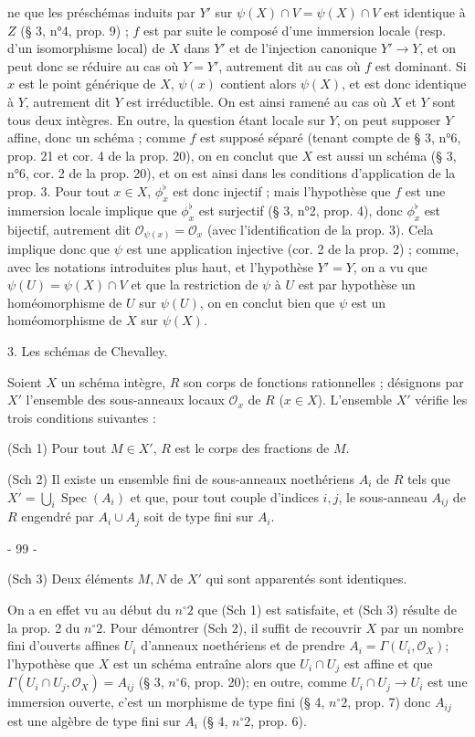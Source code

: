 ne que les préschémas induits par $Y'$ sur $\psi(X) \cap V = \psi(X) \cap V$ est identique à $Z$ (§ 3, n°4, prop. 9) ; $f$ est par suite le composé d'une immersion locale (resp. d'un isomorphisme local) de $X$ dans $Y'$ et de l'injection canonique $Y' \to Y$, et on peut donc se réduire au cas où $Y=Y'$, autrement dit au cas où $f$ est dominant. Si $x$ est le point générique de $X$, $\psi(x)$ contient alors $\psi(X)$, et est donc identique à $Y$, autrement dit $Y$ est irréductible. On est ainsi ramené au cas où $X$ et $Y$ sont tous deux intègres. En outre, la question étant locale sur $Y$, on peut supposer $Y$ affine, donc un schéma ; comme $f$ est supposé séparé (tenant compte de § 3, n°6, prop. 21 et cor. 4 de la prop. 20), on en conclut que $X$ est aussi un schéma (§ 3, n°6, cor. 2 de la prop. 20), et on est ainsi dans les conditions d'application de la prop. 3. Pour tout $x \in X$, $\phi_x^\flat$ est donc injectif ; mais l'hypothèse que $f$ est une immersion locale implique que $\phi_x^\flat$ est surjectif (§ 3, n°2, prop. 4), donc $\phi_x^\flat$ est bijectif, autrement dit $\mathcal{O}_{\psi(x)} = \mathcal{O}_x$ (avec l'identification de la prop. 3). Cela implique donc que $\psi$ est une application injective (cor. 2 de la prop. 2) ; comme, avec les notations introduites plus haut, et l'hypothèse $Y'=Y$, on a vu que $\psi(U) = \psi(X) \cap V$ et que la restriction de $\psi$ à $U$ est par hypothèse un homéomorphisme de $U$ sur $\psi(U)$, on en conclut bien que $\psi$ est un homéomorphisme de $X$ sur $\psi(X)$.

3. Les schémas de Chevalley.

Soient $X$ un schéma intègre, $R$ son corps de fonctions rationnelles ; désignons par $X'$ l'ensemble des sous-anneaux locaux $\mathcal{O}_x$ de $R$ ($x \in X$). L'ensemble $X'$ vérifie les trois conditions suivantes :

(Sch 1) Pour tout $M \in X'$, $R$ est le corps des fractions de $M$.

(Sch 2) Il existe un ensemble fini de sous-anneaux noethériens $A_i$ de $R$ tels que $X' = \bigcup_i \operatorname{Spec}(A_i)$ et que, pour tout couple d'indices $i, j$, le sous-anneau $A_{ij}$ de $R$ engendré par $A_i \cup A_j$ soit de type fini sur $A_i$.

\newpage


- 99 -

(Sch 3) Deux éléments $M, N$ de $X'$ qui sont apparentés sont identiques.

On a en effet vu au début du $n^\circ 2$ que (Sch 1) est satisfaite, et (Sch 3) résulte de la prop. 2 du $n^\circ 2$. Pour démontrer (Sch 2), il suffit de recouvrir $X$ par un nombre fini d'ouverts affines $U_i$ d'anneaux noethériens et de prendre $A_i = \Gamma(U_i, \mathcal{O}_X)$; l'hypothèse que $X$ est un schéma entraîne alors que $U_i \cap U_j$ est affine et que $\Gamma(U_i \cap U_j, \mathcal{O}_X) = A_{ij}$ (§ 3, $n^\circ 6$, prop. 20); en outre, comme $U_i \cap U_j \to U_i$ est une immersion ouverte, c'est un morphisme de type fini (§ 4, $n^\circ 2$, prop. 7) donc $A_{ij}$ est une algèbre de type fini sur $A_i$ (§ 4, $n^\circ 2$, prop. 6).

